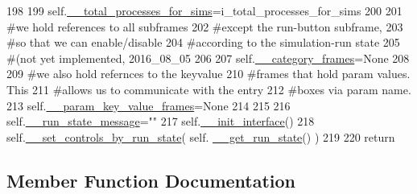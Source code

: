 \begin{DoxyCode}
198 
199         self.\hyperlink{classnegui_1_1pgguisimupop_1_1PGGuiSimuPop_a3885325060336297119229764f6548fb}{\_\_total\_processes\_for\_sims}=i\_total\_processes\_for\_sims
200 
201         \textcolor{comment}{#we hold references to all subframes}
202         \textcolor{comment}{#except the run-button subframe,}
203         \textcolor{comment}{#so that we can enable/disable}
204         \textcolor{comment}{#according to the simulation-run state}
205         \textcolor{comment}{#(not yet implemented, 2016\_08\_05}
206 
207         self.\hyperlink{classnegui_1_1pgguisimupop_1_1PGGuiSimuPop_a67da63f36462b56bd1f47206d8f91c7b}{\_\_category\_frames}=\textcolor{keywordtype}{None}
208 
209         \textcolor{comment}{#we also hold refernces to the keyvalue}
210         \textcolor{comment}{#frames that hold param values.  This}
211         \textcolor{comment}{#allows us to communicate with the entry}
212         \textcolor{comment}{#boxes via param name.}
213         self.\hyperlink{classnegui_1_1pgguisimupop_1_1PGGuiSimuPop_a272523ce4bad4d1073c506e858c59996}{\_\_param\_key\_value\_frames}=\textcolor{keywordtype}{None}
214 
215 
216         self.\hyperlink{classnegui_1_1pgguisimupop_1_1PGGuiSimuPop_a3ac3a7a5a800876180133b4cc41ca63c}{\_\_run\_state\_message}=\textcolor{stringliteral}{""}
217         self.\hyperlink{classnegui_1_1pgguisimupop_1_1PGGuiSimuPop_ad38b601eabe45f6c35525b060f0343ea}{\_\_init\_interface}()
218         self.\hyperlink{classnegui_1_1pgguisimupop_1_1PGGuiSimuPop_a2c5268e62f40c2548d1475959aa60ca9}{\_\_set\_controls\_by\_run\_state}( self.
      \hyperlink{classnegui_1_1pgguisimupop_1_1PGGuiSimuPop_aef182e14bccdbabf372a6344bc6f8786}{\_\_get\_run\_state}() )
219     
220         \textcolor{keywordflow}{return}
\end{DoxyCode}


\subsection{Member Function Documentation}
